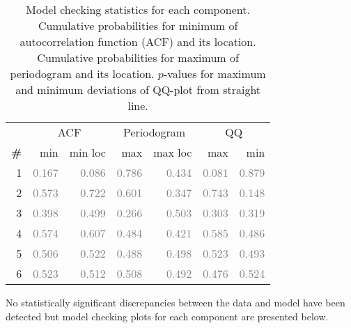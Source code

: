 \documentclass{article} %
\begin{document}
\begin{table}[htb]
\begin{center}
{\small
\begin{tabular}{|r|rr|rr|rr|}
\hline
 & \multicolumn{2}{|c|}{ACF} & \multicolumn{2}{|c|}{Periodogram} & \multicolumn{2}{|c|}{QQ} \\
\bf{\#} & {min} & {min loc} & {max} & {max loc} & {max} & {min}\\
\hline

1 & \textcolor{gray}{0.167} & \textcolor{gray}{0.086} & \textcolor{gray}{0.786} & \textcolor{gray}{0.434} & \textcolor{gray}{0.081} & \textcolor{gray}{0.879}\\

2 & \textcolor{gray}{0.573} & \textcolor{gray}{0.722} & \textcolor{gray}{0.601} & \textcolor{gray}{0.347} & \textcolor{gray}{0.743} & \textcolor{gray}{0.148}\\

3 & \textcolor{gray}{0.398} & \textcolor{gray}{0.499} & \textcolor{gray}{0.266} & \textcolor{gray}{0.503} & \textcolor{gray}{0.303} & \textcolor{gray}{0.319}\\

4 & \textcolor{gray}{0.574} & \textcolor{gray}{0.607} & \textcolor{gray}{0.484} & \textcolor{gray}{0.421} & \textcolor{gray}{0.585} & \textcolor{gray}{0.486}\\

5 & \textcolor{gray}{0.506} & \textcolor{gray}{0.522} & \textcolor{gray}{0.488} & \textcolor{gray}{0.498} & \textcolor{gray}{0.523} & \textcolor{gray}{0.493}\\

6 & \textcolor{gray}{0.523} & \textcolor{gray}{0.512} & \textcolor{gray}{0.508} & \textcolor{gray}{0.492} & \textcolor{gray}{0.476} & \textcolor{gray}{0.524}\\

\hline
\end{tabular}
\caption{
Model checking statistics for each component.
Cumulative probabilities for minimum of autocorrelation function (ACF) and its location.
Cumulative probabilities for maximum of periodogram and its location.
$p$-values for maximum and minimum deviations of QQ-plot from straight line.
}
\label{table:check}
}
\end{center}
\end{table}

No statistically significant discrepancies between the data and model have been detected but model checking plots for each component are presented below.
\end{document}
